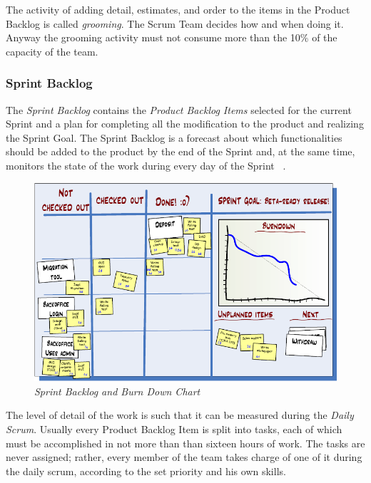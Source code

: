 			The activity of adding detail, estimates, and order to the items in the Product Backlog is called \emph{grooming}. The Scrum Team decides how and when doing it. Anyway the grooming activity must not consume more than the 10\% of the capacity of the team.
		

			\subsubsection{Sprint Backlog}\label{ref_scrum_sprint_backlog}
			The \emph{Sprint Backlog} contains the \emph{Product Backlog Items} selected for the current Sprint and a plan for completing all the modification to the product and realizing the Sprint Goal. 
			The Sprint Backlog is a forecast about which functionalities should be added to the product by the end of the Sprint and, at the same time, monitors the state of the work during every day of the Sprint ~\cite{scrumEnglishGuide}.
			
			\begin{figure}[h]
			  \begin{center} 
			    \includegraphics[scale=0.65]{images/ch_04/task_board_and_chart.png}
			  \end{center} 
			  \caption{\textit{Sprint Backlog and Burn Down Chart}}  
			  \label{fig:SprintBacklog}
		  	\end{figure}

			The level of detail of the work is such that it can be measured during the \emph{Daily Scrum}. Usually every Product Backlog Item is split into tasks, each of which must be accomplished in not more than than sixteen hours of work. The tasks are never assigned; rather, every member of the team takes charge of one of it during the daily scrum, according to the set priority and his own skills.
	
